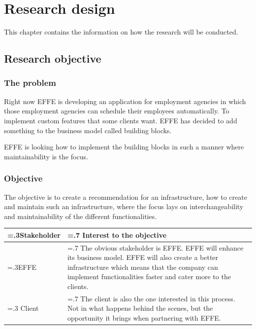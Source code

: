 
\chapter{Research design}
This chapter contains the information on how the research will be conducted.

\section{Research objective}

\subsection{The problem}
\label{sec:TheProblem}

Right now EFFE is developing an application for employment agencies in which those employment agencies can schedule their employees automatically. To implement custom features that some clients want. EFFE has decided to add something to the business model called building blocks.


EFFE is looking how to implement the building blocks in such a manner where maintainability is the focus.

\subsection{Objective}
The objective is to create a recommendation for an infrastructure, how to create and maintain such an infrastructure, where the focus lays on interchangeability and maintainability of the different functionalities.

\begin{tabularx}{\linewidth}{|>{\hsize=.3\hsize}X|>{\hsize=.7\hsize}X|}
	\hline
	Stakeholder &
	Interest to the objective
	\\
	\hline
	EFFE &
	The obvious stakeholder is EFFE. EFFE will enhance its business model. EFFE will also create a better infrastructure which means that the company can implement functionalities faster and cater more to the clients.
	\\
	\hline
	Client &
	The client is also the one interested in this process. Not in what happens behind the scenes, but the opportunity it brings when partnering with EFFE.
	\\
	\hline
\end{tabularx}

